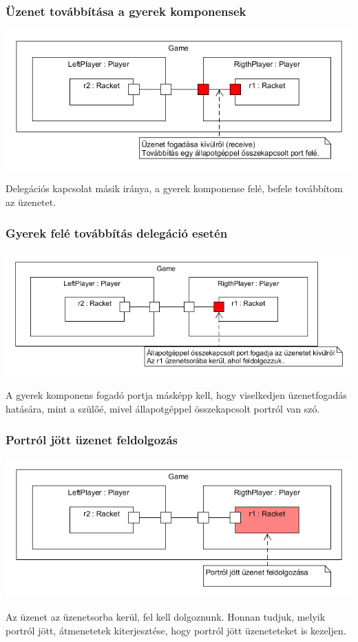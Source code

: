 \documentclass[11pt]{beamer}
\begin{document}
\begin{frame}
	\frametitle{Üzenet továbbítása a gyerek komponensek}
	\begin{center}
	\includegraphics[scale=0.5]{vedes_demo_recived.png}
	\end{center}
	Delegációs kapcsolat másik iránya, a gyerek komponense felé, befele továbbítom az üzenetet.
\end{frame}


\begin{frame}
	\frametitle{Gyerek felé továbbítás delegáció esetén}
	\begin{center}
	\includegraphics[scale=0.5]{vedes_demo_class_recived.png}
	\end{center}
	A gyerek komponens fogadó portja másképp kell, hogy viselkedjen üzenetfogadás hatására, mint a szülőé, mivel állapotgéppel összekapcsolt portról van szó.
\end{frame}

\begin{frame}
	\frametitle{Portról jött üzenet feldolgozás}
	\begin{center}
	\includegraphics[scale=0.5]{vedes_demo_recived_proc.png}
	\end{center}
		Az üzenet az üzenetsorba kerül, fel kell dolgoznunk. Honnan tudjuk, melyik portról jött, átmenetetek kiterjesztése, hogy portról jött üzeneteteket is kezeljen.
\end{frame}
\end{document}
